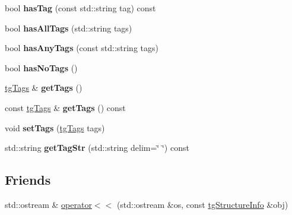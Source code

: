 \begin{DoxyCompactItemize}
\item 
\hypertarget{classtg_taggable_ae31f65869c8887bfeb34a344902c4d5b}{bool {\bfseries has\-Tag} (const std\-::string tag) const }\label{classtg_taggable_ae31f65869c8887bfeb34a344902c4d5b}

\item 
\hypertarget{classtg_taggable_a33b77b1075171b63f673965687b2e844}{bool {\bfseries has\-All\-Tags} (std\-::string tags)}\label{classtg_taggable_a33b77b1075171b63f673965687b2e844}

\item 
\hypertarget{classtg_taggable_af14af28fa98021c4f20a5e8f2ddd5606}{bool {\bfseries has\-Any\-Tags} (const std\-::string tags)}\label{classtg_taggable_af14af28fa98021c4f20a5e8f2ddd5606}

\item 
\hypertarget{classtg_taggable_adff345e116e16420c701a748ff8f995f}{bool {\bfseries has\-No\-Tags} ()}\label{classtg_taggable_adff345e116e16420c701a748ff8f995f}

\item 
\hypertarget{classtg_taggable_acf1d7fa9df8f374f25015c4080902681}{\hyperlink{classtg_tags}{tg\-Tags} \& {\bfseries get\-Tags} ()}\label{classtg_taggable_acf1d7fa9df8f374f25015c4080902681}

\item 
\hypertarget{classtg_taggable_ae70d7d3b45301665bc363b0ed8b9b292}{const \hyperlink{classtg_tags}{tg\-Tags} \& {\bfseries get\-Tags} () const }\label{classtg_taggable_ae70d7d3b45301665bc363b0ed8b9b292}

\item 
\hypertarget{classtg_taggable_a5492888e4e4da4cca6261070b5726adf}{void {\bfseries set\-Tags} (\hyperlink{classtg_tags}{tg\-Tags} tags)}\label{classtg_taggable_a5492888e4e4da4cca6261070b5726adf}

\item 
\hypertarget{classtg_taggable_a346d66b066d2d9eb1eadba01da43749f}{std\-::string {\bfseries get\-Tag\-Str} (std\-::string delim=\char`\"{} \char`\"{}) const }\label{classtg_taggable_a346d66b066d2d9eb1eadba01da43749f}

\end{DoxyCompactItemize}
\subsection*{Friends}
\begin{DoxyCompactItemize}
\item 
std\-::ostream \& \hyperlink{classtg_structure_info_a9ab7cd01b53c61486c9a319ec7e62107}{operator$<$$<$} (std\-::ostream \&os, const \hyperlink{classtg_structure_info}{tg\-Structure\-Info} \&obj)
\end{DoxyCompactItemize}


